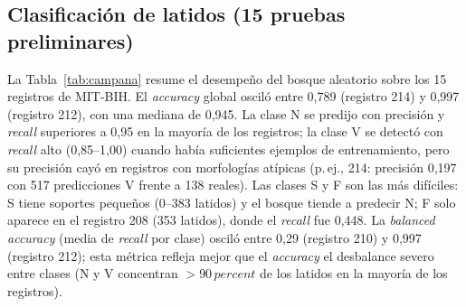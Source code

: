 \subsection{Clasificación de latidos (15 pruebas preliminares)}
La Tabla~\ref{tab:campana} resume el desempeño del bosque aleatorio
sobre los 15 registros de MIT-BIH. El \emph{accuracy} global osciló
entre 0,789 (registro 214) y 0,997 (registro 212), con una mediana de
0,945. La clase N se predijo con precisión y \emph{recall} superiores a
0,95 en la mayoría de los registros; la clase V se detectó con
\emph{recall} alto (0,85--1,00) cuando había suficientes ejemplos de
entrenamiento, pero su precisión cayó en registros con morfologías
atípicas (p.\,ej., 214: precisión 0,197 con 517 predicciones V frente a
138 reales). Las clases S y F son las más difíciles: S tiene soportes
pequeños (0--383 latidos) y el bosque tiende a predecir N; F solo
aparece en el registro 208 (353 latidos), donde el \emph{recall} fue
0,448. La \emph{balanced accuracy} (media de \emph{recall} por clase)
osciló entre 0,29 (registro 210) y 0,997 (registro 212); esta métrica
refleja mejor que el \emph{accuracy} el desbalance severo entre clases
(N y V concentran $>90\,percent$ de los latidos en la mayoría de los
registros).

